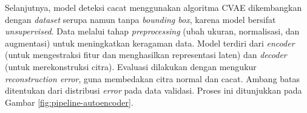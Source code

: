 Selanjutnya, model deteksi cacat menggunakan algoritma CVAE
dikembangkan dengan \textit{dataset} serupa namun tanpa
\textit{bounding box}, karena
model bersifat \textit{unsupervised}. Data melalui tahap
\textit{preprocessing} (ubah ukuran, normalisasi, dan augmentasi)
untuk meningkatkan keragaman data. Model terdiri dari
\textit{encoder} (untuk mengestraksi fitur dan
menghasilkan representasi laten) dan \textit{decoder} (untuk
merekonstruksi citra). Evaluasi dilakukan dengan mengukur \textit{reconstruction
error}, guna membedakan citra normal dan cacat. Ambang batas
ditentukan dari distribusi \textit{error} pada data validasi. Proses ini
ditunjukkan pada Gambar \ref{fig:pipeline-autoencoder}.


